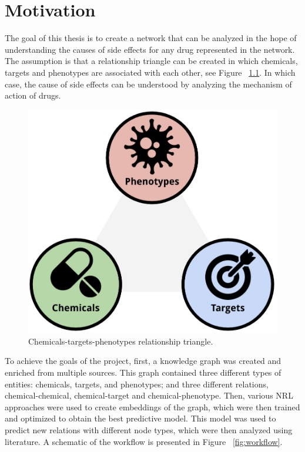 \chapter{Motivation}
\label{motivation}

The goal of this thesis is to create a network that can be analyzed in the hope of understanding the causes of side effects for any drug represented in the network. The assumption is that a relationship triangle can be created in which chemicals, targets and phenotypes are associated with each other, see Figure ~\ref{fig:triangle}. In which case, the cause of side effects can be understood by analyzing the mechanism of action of drugs.

\begin{figure}[!ht]
    \centering
    \includegraphics[scale=0.175]
    {figures/triangle.jpg}
    \caption{\label{fig:triangle} Chemicals-targets-phenotypes relationship triangle.}
\end{figure}

To achieve the goals of the project, first, a knowledge graph was created and enriched from multiple sources. This graph contained three different types of entities: chemicals, targets, and phenotypes; and three different relations, chemical-chemical, chemical-target and chemical-phenotype. Then, various \ac{NRL} approaches were used to create embeddings of the graph, which were then trained and optimized to obtain the best predictive model. This model was used to predict new relations with different node types, which were then analyzed using literature. A schematic of the workflow is presented in Figure ~\ref{fig:workflow}.

